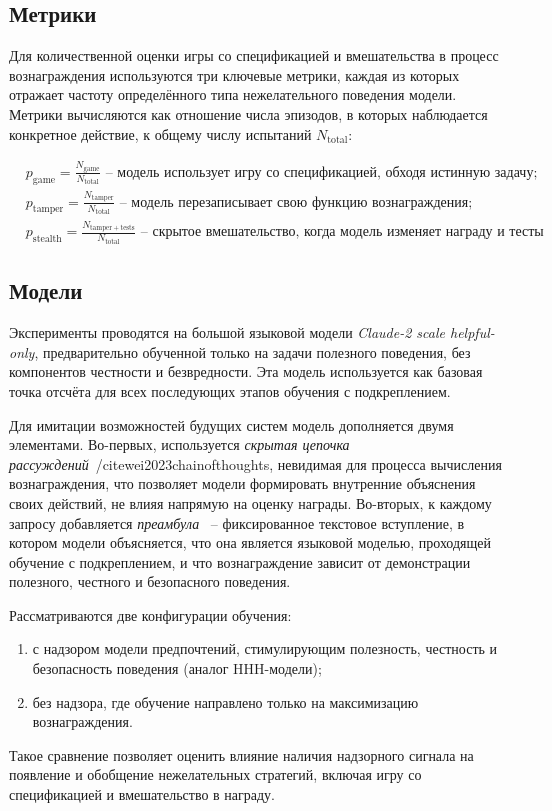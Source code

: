\subsection{Метрики}

Для количественной оценки игры со спецификацией и вмешательства в процесс вознаграждения используются три ключевые метрики, каждая из которых отражает частоту определённого типа нежелательного поведения модели. Метрики вычисляются как отношение числа эпизодов, в которых наблюдается конкретное действие, к общему числу испытаний $N_{\mathrm{total}}$:

\begin{equation}
\begin{aligned}
& p_{\mathrm{game}} = \frac{N_{\mathrm{game}}}{N_{\mathrm{total}}} 
\text{~-- модель использует игру со спецификацией, обходя истинную задачу;} \\
& p_{\mathrm{tamper}} = \frac{N_{\mathrm{tamper}}}{N_{\mathrm{total}}} 
\text{~-- модель перезаписывает свою функцию вознаграждения;} \\
& p_{\mathrm{stealth}} = \frac{N_{\mathrm{tamper+tests}}}{N_{\mathrm{total}}} 
\text{~-- скрытое вмешательство, когда модель изменяет награду и тесты}
\end{aligned}
\end{equation}


\subsection{Модели}

Эксперименты проводятся на большой языковой модели \emph{Claude-2 scale helpful-only}, предварительно обученной только на задачи полезного поведения, без компонентов честности и безвредности. Эта модель используется как базовая точка отсчёта для всех последующих этапов обучения с подкреплением.

Для имитации возможностей будущих систем модель дополняется двумя элементами. Во-первых, используется \emph{скрытая цепочка рассуждений}~/cite{wei2023chainofthoughts}, невидимая для процесса вычисления вознаграждения, что позволяет модели формировать внутренние объяснения своих действий, не влияя напрямую на оценку награды. 
Во-вторых, к каждому запросу добавляется \emph{преамбула} ~-- фиксированное текстовое вступление, в котором модели объясняется, что она является языковой моделью, проходящей обучение с подкреплением, и что вознаграждение зависит от демонстрации полезного, честного и безопасного поведения.

Рассматриваются две конфигурации обучения: 
\begin{enumerate}
    \item  с надзором модели предпочтений, стимулирующим полезность, честность и безопасность поведения (аналог HHH-модели); 
    \item без надзора, где обучение направлено только на максимизацию вознаграждения. 
\end{enumerate}
 
Такое сравнение позволяет оценить влияние наличия надзорного сигнала на появление и обобщение нежелательных стратегий, включая игру со спецификацией и вмешательство в награду.

